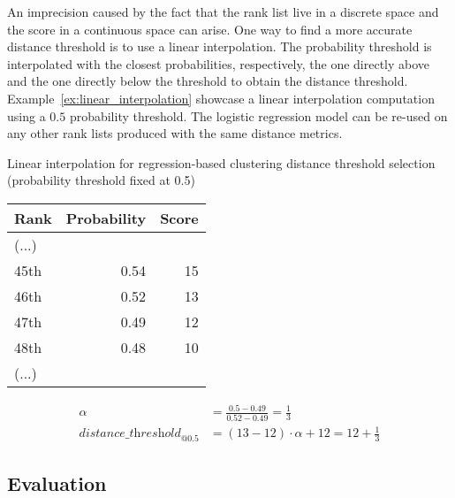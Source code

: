 An imprecision caused by the fact that the rank list live in a discrete space and the score in a continuous space can arise.
One way to find a more accurate distance threshold is to use a linear interpolation.
The probability threshold is interpolated with the closest probabilities, respectively, the one directly above and the one directly below the threshold to obtain the distance threshold.
Example~\ref{ex:linear_interpolation} showcase a linear interpolation computation using a $0.5$ probability threshold.
The logistic regression model can be re-used on any other rank lists produced with the same distance metrics.

\begin{example}
  \centering
  \caption{Linear interpolation for regression-based clustering distance threshold selection (probability threshold fixed at 0.5)}
  \label{ex:linear_interpolation}

  \begin{subexample}{\linewidth}
    \centering
    \begin{tabular}{l r r}
      \toprule
      Rank & Probability & Score \\
      \midrule
      (...) & &\\
      45th & 0.54 & 15 \\
      46th & 0.52 & 13 \\
      47th & 0.49 & 12 \\
      48th & 0.48 & 10 \\
      (...) & & \\
      \bottomrule
    \end{tabular}
  \end{subexample}

  \vspace{0.5cm}

  \begin{subexample}{\linewidth}
    \centering
    \begin{align*}
        \alpha &= \frac{0.5 - 0.49}{0.52 - 0.49} = \frac{1}{3} \\
        \textit{distance\_threshold}_{@0.5} &= (13 - 12) \cdot \alpha + 12 = 12 + \frac{1}{3}
    \end{align*}
  \end{subexample}
\end{example}


\subsection{Evaluation}

